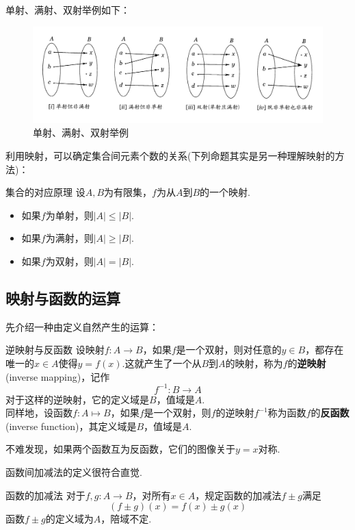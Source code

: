 \documentclass[lang=cn, zihao=5]{elegantbook}
\begin{document}
单射、满射、双射举例如下：

\begin{figure}[h!]
	\centering
	\includegraphics{attachment/20230403teuuykue.pdf}
	\caption{单射、满射、双射举例}
\end{figure}

利用映射，可以确定集合间元素个数的关系(下列命题其实是另一种理解映射的方法)：

\begin{proposition}{集合的对应原理}
	设$A,B$为有限集，$f$为从$A$到$B$的一个映射. 
	\begin{itemize}
		\item 如果$f$为单射，则$|A| \leq |B|$. 
		\item 如果$f$为满射，则$|A| \geq |B|$. 
		\item 如果$f$为双射，则$|A| = |B|$. 
	\end{itemize}
\end{proposition}

\subsection{映射与函数的运算}

先介绍一种由定义自然产生的运算：

\begin{definition}{逆映射与反函数} %
    设映射$f:A \to B$，如果$f$是一个双射，则对任意的$y \in B$，都存在唯一的$x \in A$使得$y=f(x)$.这就产生了一个从$B$到$A$的映射，称为$f$的\textbf{逆映射}(inverse mapping)，记作$$f^{-1}:B \to A$$
    对于这样的逆映射，它的定义域是$B$，值域是$A$.\\
    同样地，设函数$f:A \mapsto B$，如果$f$是一个双射，则$f$的逆映射$f^{-1}$称为函数$f$的\textbf{反函数}(inverse function)，其定义域是$B$，值域是$A$.
\end{definition}

不难发现，如果两个函数互为反函数，它们的图像关于$y=x$对称.

函数间加减法的定义很符合直觉.

\begin{definition}{函数的加减法}
	对于$f,g:A \to B$，对所有$x \in A$，规定函数的加减法$f \pm g$满足$$(f \pm g)(x) = f(x) \pm g(x)$$
	函数$f \pm g$的定义域为$A$，陪域不定.
\end{definition}
\end{document}
